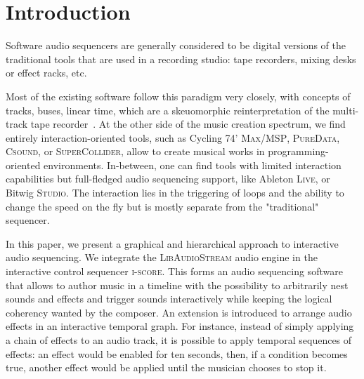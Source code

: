 \documentclass{article}
\title{\papertitle}
\newcommand*{\LibAudioStream}{\textsc{LibAudioStream}\xspace}
\newcommand*{\iscore}{\textsc{i-score}\xspace}
\newcommand*{\maxmsp}{Cycling 74' \textsc{Max/MSP}\xspace}
\newcommand*{\puredata}{\textsc{PureData}\xspace}
\newcommand*{\csound}{\textsc{Csound}\xspace}
\newcommand*{\supercollider}{\textsc{SuperCollider}\xspace}
\newcommand*{\abletonlive}{Ableton \textsc{Live}\xspace}
\newcommand*{\bitwigstudio}{Bitwig \textsc{Studio}\xspace}
\begin{document}
\capstartfalse
\maketitle
\capstarttrue

\begin{abstract}
The field of digital music authoring provides a wealth of creative environments in which music can be created and authored: patchers, programming languages, and multitrack sequencers.
By combining the \iscore interactive sequencer to the \LibAudioStream audio engine, a new music software able to represent and play rich interactive audio sequences is introduced.
We present new stream expressions compatible with the \LibAudioStream, and 
use them to create an interactive audio graph: hierarchical stream and send - return streams.
This allows to create branching and arbitrarily nested musical scores, in an OSC-centric environment.
Three examples of interactive musical scores are presented: the recreation of a traditional multi-track sequencer, an interactive musical score, and a temporal effect graph.
\end{abstract}

\section{Introduction}
Software audio sequencers are generally considered to be digital versions 
of the traditional tools that are used in a recording studio: tape recorders, 
mixing desks or effect racks, etc.

Most of the existing software follow this paradigm very closely, with 
concepts of tracks, buses, linear time, which are a skeuomorphic reinterpretation of the multi-track tape recorder~\cite{bell2015skeuomorphism}.
At the other side of the music creation spectrum, we find entirely interaction-oriented tools, 
such as \maxmsp, \puredata, \csound, or \supercollider, allow to create musical works in programming-oriented 
environments.
In-between, one can find tools with limited interaction capabilities but full-fledged audio sequencing support, 
like \abletonlive, or \bitwigstudio.
The interaction lies in the triggering of loops and the ability to change the speed on the fly but is mostly separate from the "traditional" sequencer.

In this paper, we present a graphical and hierarchical approach to interactive audio sequencing.
We integrate the \LibAudioStream audio engine in the interactive control sequencer \iscore.
This forms an audio sequencing software that allows to author music in a timeline 
with the possibility to arbitrarily nest sounds and effects and trigger sounds interactively 
while keeping the logical coherency wanted by the composer. 
An extension is introduced to arrange audio effects in an interactive temporal graph.
For instance, instead of simply applying a chain of effects to an audio track, it is possible to apply temporal sequences of effects: an effect would be enabled for ten seconds, then, if a condition becomes true, another effect would be applied until the musician chooses to stop it.
\end{document}
